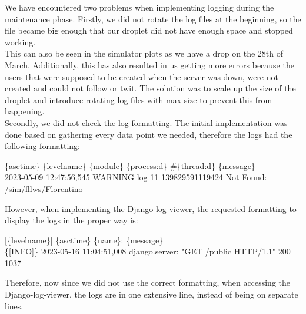 We have encountered two problems when implementing logging during the maintenance phase. Firstly, we did not rotate the log files at the beginning, so the file became big enough that our droplet did not have enough space and stopped working.\\
This can also be seen in the simulator plots as we have a drop on the 28th of March. Additionally, this has also resulted in us getting more errors because the users that were supposed to be created when the server was down, were not created and could not follow or twit. The solution was to scale up the size of the droplet and introduce rotating log files with max-size to prevent this from happening.\\
Secondly, we did not check the log formatting. The initial implementation was done based on gathering every data point we needed, therefore the logs had the following formatting:
\begin{center}
    \{asctime\} \{levelname\} \{module\} \{process:d\} \#\{thread:d\} \{message\}\\
    2023-05-09 12:47:56,545 WARNING log 11 139829591119424 Not Found: /sim/fllws/Florentino
\end{center}
However, when implementing the Django-log-viewer, the requested formatting to display the logs in the proper way is:
\begin{center}
    [\{levelname\}] \{asctime\} \{name\}: \{message\}\\
    \{[INFO]\} 2023-05-16 11:04:51,008 django.server: "GET /public HTTP/1.1" 200 1037
\end{center}
Therefore, now since we did not use the correct formatting, when accessing the Django-log-viewer, the logs are in one extensive line, instead of being on separate lines.